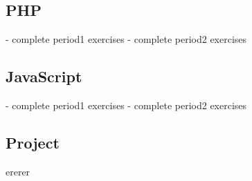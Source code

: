 \subsection{PHP}
- complete period1 exercises
- complete period2 exercises

\subsection{JavaScript}
- complete period1 exercises
- complete period2 exercises



\subsection{Project}

ererer
